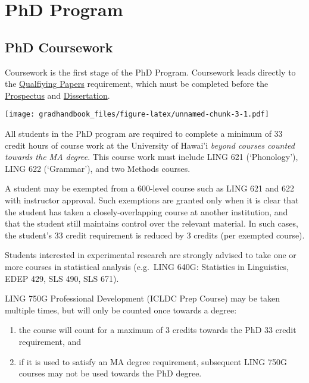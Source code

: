 \documentclass[
]{book}
\providecommand{\tightlist}{%
  \setlength{\itemsep}{0pt}\setlength{\parskip}{0pt}}
\begin{document}
\hypertarget{part-phd-program}{%
\part*{PhD Program}\label{part-phd-program}}

\hypertarget{phdprogram}{%
\chapter{PhD Coursework}\label{phdprogram}}

Coursework is the first stage of the PhD Program. Coursework leads directly to the \protect\hyperlink{qp}{Qualfiying Papers} requirement, which must be completed before the \protect\hyperlink{prospectus}{Prospectus} and \protect\hyperlink{dissertation}{Dissertation}.

\texttt{[image: gradhandbook\_files/figure-latex/unnamed-chunk-3-1.pdf]}

All students in the PhD program are required to complete a minimum of 33 credit hours of course work at the University of Hawai'i \emph{beyond courses counted towards the MA degree}. This course work must include LING 621 (`Phonology'), LING 622 (`Grammar'), and two Methods courses.

A student may be exempted from a 600-level course such as LING 621 and 622 with instructor approval. Such exemptions are granted only when it is clear that the student has taken a closely-overlapping course at another institution, and that the student still maintains control over the relevant material. In such cases, the student's 33 credit requirement is reduced by 3 credits (per exempted course).

Students interested in experimental research are strongly advised to take one or more courses in statistical analysis (e.g.~LING 640G: Statistics in Linguistics, EDEP 429, SLS 490, SLS 671).

LING 750G Professional Development (ICLDC Prep Course) may be taken multiple times, but will only be counted once towards a degree:

\begin{enumerate}
\def\labelenumi{\roman{enumi}.}
\tightlist
\item
  the course will count for a maximum of 3 credits towards the PhD 33 credit requirement, and
\item
  if it is used to satisfy an MA degree requirement, subsequent LING 750G courses may not be used towards the PhD degree.
\end{enumerate}
\end{document}
